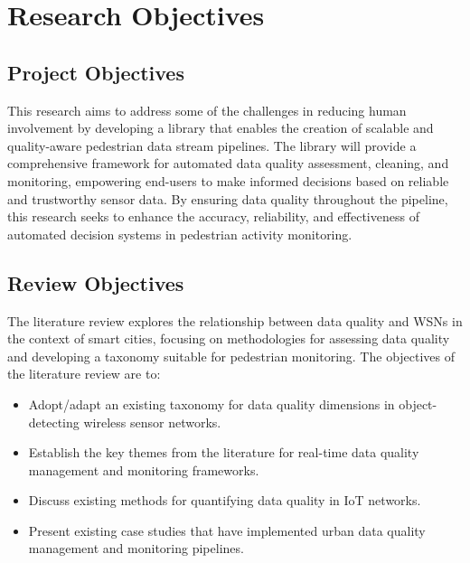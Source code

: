 \section{Research Objectives}

\subsection{Project Objectives}
This research aims to address some of the challenges in reducing human involvement by developing a library that enables the creation of scalable and quality-aware pedestrian data stream pipelines. The library will provide a comprehensive framework for automated data quality assessment, cleaning, and monitoring, empowering end-users to make informed decisions based on reliable and trustworthy sensor data. By ensuring data quality throughout the pipeline, this research seeks to enhance the accuracy, reliability, and effectiveness of automated decision systems in pedestrian activity monitoring.

\subsection{Review Objectives}
The literature review explores the relationship between data quality and WSNs in the context of smart cities, focusing on methodologies for assessing data quality and developing a taxonomy suitable for pedestrian monitoring. The objectives of the literature review are to:

\begin{itemize}
    \item Adopt/adapt an existing taxonomy for data quality dimensions in object-detecting wireless sensor networks.
    \item Establish the key themes from the literature for real-time data quality management and monitoring frameworks.
    \item Discuss existing methods for quantifying data quality in IoT networks.
    \item Present existing case studies that have implemented urban data quality management and monitoring pipelines.
\end{itemize}

